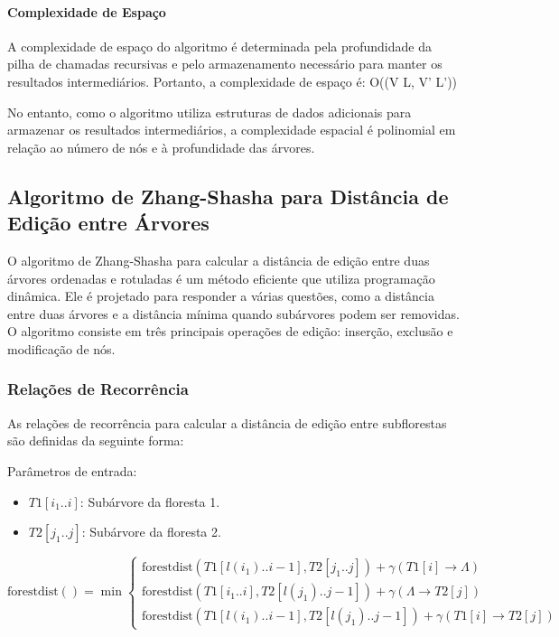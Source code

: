 \documentclass[12pt]{article}
\begin{document}
\paragraph{Complexidade de Espaço}

A complexidade de espaço do algoritmo é determinada pela profundidade da pilha de chamadas recursivas e pelo armazenamento necessário para manter os resultados intermediários. Portanto, a complexidade de espaço é: O(\max(V \cdot L, V' \cdot L'))

No entanto, como o algoritmo utiliza estruturas de dados adicionais para armazenar os resultados intermediários, a complexidade espacial é polinomial em relação ao número de nós e à profundidade das árvores.


\subsection{Algoritmo de Zhang-Shasha para Distância de Edição entre Árvores}

O algoritmo de Zhang-Shasha para calcular a distância de edição entre duas árvores ordenadas e rotuladas é um método eficiente que utiliza programação dinâmica. Ele é projetado para responder a várias questões, como a distância entre duas árvores e a distância mínima quando subárvores podem ser removidas. O algoritmo consiste em três principais operações de edição: inserção, exclusão e modificação de nós.

\subsubsection{Relações de Recorrência}

As relações de recorrência para calcular a distância de edição entre subflorestas são definidas da seguinte forma:

Parâmetros de entrada: 
\begin{itemize}
    \item \(T1[i_1..i]\): Subárvore da floresta 1.
    \item \(T2[j_1..j]\): Subárvore da floresta 2.
\end{itemize}

\[
\text{forestdist}() = \min \begin{cases}
    \text{forestdist}(T1[l(i_1)..i-1], T2[j_1..j]) + \gamma(T1[i] \to \Lambda) \\
    \text{forestdist}(T1[i_1..i], T2[l(j_1)..j-1]) + \gamma(\Lambda \to T2[j]) \\
    \text{forestdist}(T1[l(i_1)..i-1], T2[l(j_1)..j-1]) + \gamma(T1[i] \to T2[j])
\end{cases}
\]
\end{document}
